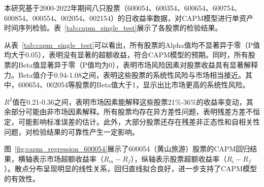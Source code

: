 \documentclass[12pt, a4paper]{article}
\begin{document}
本研究基于2000-2022年期间八只股票（600054、600354、600654、600754、600854、000554、002054、002154）的日收益率数据，对CAPM模型进行单资产时间序列检验。表~\ref{tab:capm_single_test}展示了各股票的检验结果。

\begin{table}[htbp]
\centering
\caption{CAPM单资产时间序列检验结果}
\label{tab:capm_single_test}
\end{table}

从表~\ref{tab:capm_single_test}可以看出，所有股票的Alpha值均不显著异于零（P值均大于0.05），表明没有显著的超额收益，符合CAPM模型的预期。同时，所有股票的Beta值显著异于零（P值均为0），表明市场风险因素对股票收益具有显著解释力。Beta值介于0.94-1.08之间，表明这些股票的系统性风险与市场相当接近。其中，600654、002054等股票的Beta值大于1，显示出比市场更高的系统性风险。

$R^2$值在0.21-0.36之间，表明市场因素能解释这些股票21\%-36\%的收益率变动，其余部分可能由非市场因素解释。所有股票均存在异方差性问题，表明残差方差不恒定，可能影响标准误差的估计。此外，大部分股票还存在残差非正态性和自相关性问题，对检验结果的可靠性产生一定影响。

图~\ref{fig:capm_regression_600054}展示了600054（黄山旅游）股票的CAPM回归结果，横轴表示市场超额收益率（$R_m-R_f$），纵轴表示股票超额收益率（$R_i-R_f$）。散点分布呈现明显的线性关系，回归直线拟合良好，进一步支持了CAPM模型的有效性。
\end{document}
